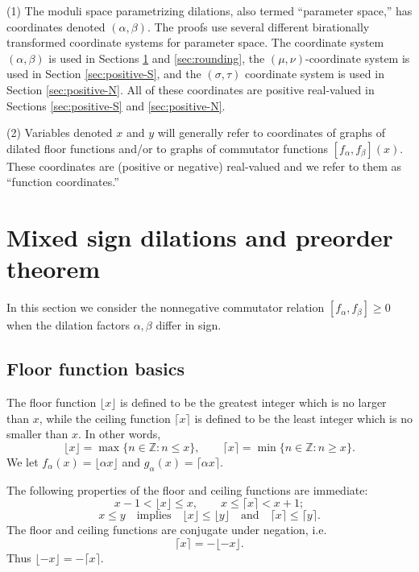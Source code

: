 \documentclass[11pt, letterpaper, reqno]{amsart}
\theoremstyle{definition}
\numberwithin{equation}{section}
\newcommand{\ZZ}{\ensuremath{\mathbb{Z}}}
\newcommand{\floor}[1]{\lfloor{#1}\rfloor}
\newcommand{\ceil}[1]{\lceil{#1}\rceil}
\newcommand{\um}{{\mu}}
\newcommand{\vm}{{\nu}}
\newcommand{\talpha}{{\sigma}}
\newcommand{\trho}{{\tau}}
\begin{document}
(1) The moduli space parametrizing  dilations, also termed ``parameter space,''
 has  coordinates denoted $(\alpha, \beta)$.
The proofs use several different birationally transformed coordinate systems for parameter space.
The  coordinate system  $(\alpha, \beta)$ is used in Sections \ref{sec:basic} and \ref{sec:rounding},
 the  $(\um, \vm)$-coordinate system is used in Section \ref{sec:positive-S}, 
and   the $(\talpha, \trho)$ coordinate system is used in
Section \ref{sec:positive-N}. 
All of these coordinates are positive real-valued in Sections \ref{sec:positive-S} and \ref{sec:positive-N}.


(2) Variables denoted $x$ and $y$  will generally
refer to coordinates of  graphs of dilated floor functions and/or to
 graphs of commutator functions $[f_{\alpha}, f_{\beta}](x)$. 
 These coordinates are  (positive or negative) real-valued and we refer to them as 
``function coordinates.'' 


%
%
\section{Mixed sign dilations  and preorder theorem}
\label{sec:basic}
\setcounter{equation}{0}

In this section we consider the nonnegative commutator relation $[f_\alpha,f_\beta]\geq 0$ when the dilation factors $\alpha, \beta$ differ in sign.


\subsection{Floor function basics}
The floor function $\floor{x}$ is defined to be the greatest integer which is no larger than $x$,
while the ceiling function $\ceil{x}$ is defined to be the least integer which is no smaller than $x$.
In other words,
\begin{equation*}
\floor{x} = \max\{ n\in \ZZ : n\leq x \}, \qquad 
\ceil{x} = \min\{ n\in \ZZ : n\geq x\}.
\end{equation*}
We let $f_{\alpha}(x) = \floor {\alpha x }$ and $g_{\alpha}(x) = \ceil {\alpha x}$.

The following properties of the floor and ceiling functions  are immediate:
\begin{equation}\label{floor-bounds}
x-1 < \floor{x} \leq x, \qquad x \leq \ceil{x} < x+1 ;
\end{equation}
\begin{equation}\label{eq:monotonic}
x\leq y \quad\text{implies}\quad 
\floor{x} \leq \floor{y} \quad\text{and}\quad \ceil{x} \leq \ceil{y}.
\end{equation}
The floor and ceiling functions are conjugate under negation, i.e.
\begin{equation}\label{floor-ceil}
\ceil{x} = -\floor{-x}.
\end{equation}
Thus $\floor{-x} = -\ceil{x}$.
\end{document}
